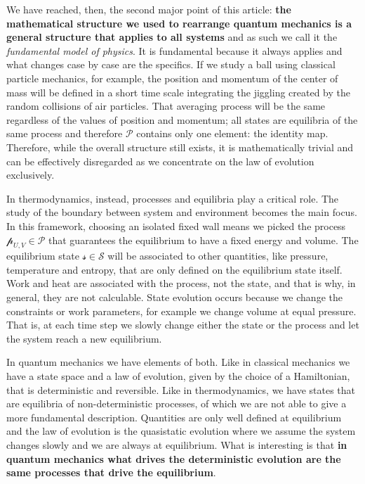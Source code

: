 \documentclass[11pt]{article}
\begin{document}
We have reached, then, the second major point of this article: \textbf{the mathematical structure we used to rearrange quantum mechanics is a general structure that applies to all systems} and as such we call it the \emph{fundamental model of physics}. It is fundamental because it always applies and what changes case by case are the specifics. If we study a ball using classical particle mechanics, for example, the position and momentum of the center of mass will be defined in a short time scale integrating the jiggling created by the random collisions of air particles. That averaging process will be the same regardless of the values of position and momentum; all states are equilibria of the same process and therefore $\mathcal{P}$ contains only one element: the identity map. Therefore, while the overall structure still exists, it is mathematically trivial and can be effectively disregarded as we concentrate on the law of evolution exclusively.

In thermodynamics, instead, processes and equilibria play a critical role. The study of the boundary between system and environment becomes the main focus. In this framework, choosing an isolated fixed wall means we picked the process $\mathcal{p}_{U,V} \in \mathcal{P}$ that guarantees the equilibrium to have a fixed energy and volume. The equilibrium state $\mathcal{s} \in \mathcal{S}$ will be associated to other quantities, like pressure, temperature and entropy, that are only defined on the equilibrium state itself. Work and heat are associated with the process, not the state, and that is why, in general, they are not calculable. State evolution occurs because we change the constraints or work parameters, for example we change volume at equal pressure. That is, at each time step we slowly change either the state or the process and let the system reach a new equilibrium.

In quantum mechanics we have elements of both. Like in classical mechanics we have a state space and a law of evolution, given by the choice of a Hamiltonian, that is deterministic and reversible. Like in thermodynamics, we have states that are equilibria of non-deterministic processes, of which we are not able to give a more fundamental description. Quantities are only well defined at equilibrium and the law of evolution is the quasistatic evolution where we assume the system changes slowly and we are always at equilibrium. What is interesting is that \textbf{in quantum mechanics what drives the deterministic evolution are the same processes that drive the equilibrium}.
\end{document}
